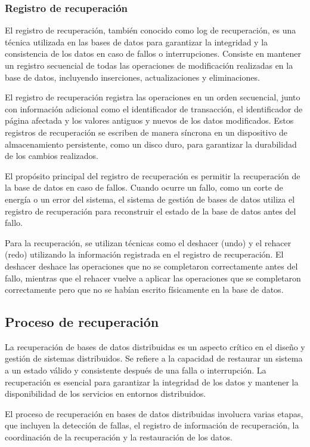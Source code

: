 \subsubsection{Registro de recuperación}
\noindent
El registro de recuperación, también conocido como log de recuperación, es una técnica utilizada en las bases de datos para garantizar la integridad y la consistencia de los datos en caso de fallos o interrupciones. Consiste en mantener un registro secuencial de todas las operaciones de modificación realizadas en la base de datos, incluyendo inserciones, actualizaciones y eliminaciones.

El registro de recuperación registra las operaciones en un orden secuencial, junto con información adicional como el identificador de transacción, el identificador de página afectada y los valores antiguos y nuevos de los datos modificados. Estos registros de recuperación se escriben de manera síncrona en un dispositivo de almacenamiento persistente, como un disco duro, para garantizar la durabilidad de los cambios realizados.

El propósito principal del registro de recuperación es permitir la recuperación de la base de datos en caso de fallos. Cuando ocurre un fallo, como un corte de energía o un error del sistema, el sistema de gestión de bases de datos utiliza el registro de recuperación para reconstruir el estado de la base de datos antes del fallo.

Para la recuperación, se utilizan técnicas como el deshacer (undo) y el rehacer (redo) utilizando la información registrada en el registro de recuperación. El deshacer deshace las operaciones que no se completaron correctamente antes del fallo, mientras que el rehacer vuelve a aplicar las operaciones que se completaron correctamente pero que no se habían escrito físicamente en la base de datos.

\subsection{Proceso de recuperación}
\noindent
La recuperación de bases de datos distribuidas es un aspecto crítico en el diseño y gestión de sistemas distribuidos. Se refiere a la capacidad de restaurar un sistema a un estado válido y consistente después de una falla o interrupción. La recuperación es esencial para garantizar la integridad de los datos y mantener la disponibilidad de los servicios en entornos distribuidos.

El proceso de recuperación en bases de datos distribuidas involucra varias etapas, que incluyen la detección de fallas, el registro de información de recuperación, la coordinación de la recuperación y la restauración de los datos.

